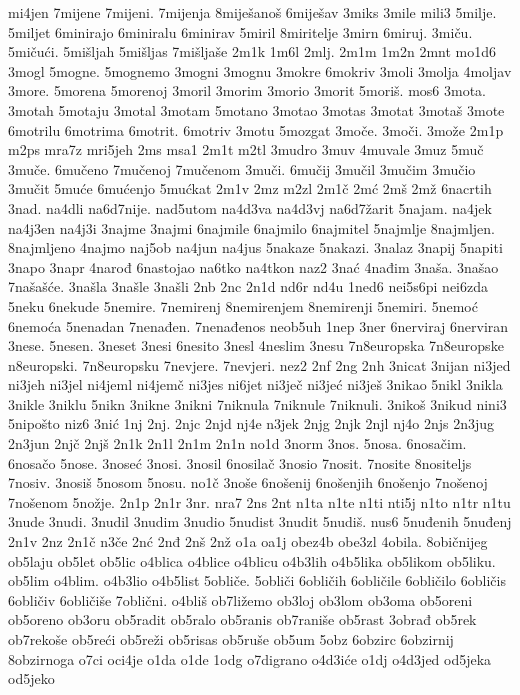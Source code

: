 {mi4jen
7mijene
7mijeni.
7mijenja
8miješanoš
6miješav
3miks
3mile
mili3
5milje.
5miljet
6minirajo
6miniralu
6minirav
5miril
8miritelje
3mirn
6miruj.
3miču.
5mičući.
5mišljah
5mišljas
7mišljaše
2m1k
1m6l
2mlj.
2m1m
1m2n
2mnt
mo1d6
3mogl
5mogne.
5mognemo
3mogni
3mognu
3mokre
6mokriv
3moli
3molja
4moljav
3more.
5morena
5morenoj
3moril
3morim
3morio
3morit
5moriš.
mos6
3mota.
3motah
5motaju
3motal
3motam
5motano
3motao
3motas
3motat
3motaš
3mote
6motrilu
6motrima
6motrit.
6motriv
3motu
5mozgat
3moče.
3moči.
3može
2m1p
m2ps
mra7z
mri5jeh
2ms
msa1
2m1t
m2tl
3mudro
3muv
4muvale
3muz
5muč
3muče.
6mučeno
7mučenoj
7mučenom
3muči.
6mučij
3mučil
3mučim
3mučio
3mučit
5muće
6mućenjo
5mućkat
2m1v
2mz
m2zl
2m1č
2mć
2mš
2mž
6nacrtih
3nad.
na4dli
na6d7nije.
nad5utom
na4d3va
na4d3vj
na6d7žarit
5najam.
na4jek
na4j3en
na4j3i
3najme
3najmi
6najmile
6najmilo
6najmitel
5najmlje
8najmljen.
8najmljeno
4najmo
naj5ob
na4jun
na4jus
5nakaze
5nakazi.
3nalaz
3napij
5napiti
3napo
3napr
4narođ
6nastojao
na6tko
na4tkon
naz2
3nać
4nađim
3naša.
3našao
7našašće.
3našla
3našle
3našli
2nb
2nc
2n1d
nd6r
nd4u
1ned6
nei5s6pi
nei6zda
5neku
6nekude
5nemire.
7nemirenj
8nemirenjem
8nemirenji
5nemiri.
5nemoć
6nemoća
5nenadan
7nenađen.
7nenađenos
neob5uh
1nep
3ner
6nerviraj
6nerviran
3nese.
5nesen.
3neset
3nesi
6nesito
3nesl
4neslim
3nesu
7n8europska
7n8europske
n8europski.
7n8europsku
7nevjere.
7nevjeri.
nez2
2nf
2ng
2nh
3nicat
3nijan
ni3jed
ni3jeh
ni3jel
ni4jeml
ni4jemč
ni3jes
ni6jet
ni3ječ
ni3jeć
ni3ješ
3nikao
5nikl
3nikla
3nikle
3niklu
5nikn
3nikne
3nikni
7niknula
7niknule
7niknuli.
3nikoš
3nikud
nini3
5nipošto
niz6
3nić
1nj
2nj.
2njc
2njd
nj4e
n3jek
2njg
2njk
2njl
nj4o
2njs
2n3jug
2n3jun
2njč
2njš
2n1k
2n1l
2n1m
2n1n
no1d
3norm
3nos.
5nosa.
6nosačim.
6nosačo
5nose.
3noseć
3nosi.
3nosil
6nosilač
3nosio
7nosit.
7nosite
8nositeljs
7nosiv.
3nosiš
5nosom
5nosu.
no1č
3noše
6nošenij
6nošenjih
6nošenjo
7nošenoj
7nošenom
5nožje.
2n1p
2n1r
3nr.
nra7
2ns
2nt
n1ta
n1te
n1ti
nti5j
n1to
n1tr
n1tu
3nude
3nudi.
3nudil
3nudim
3nudio
5nudist
3nudit
5nudiš.
nus6
5nuđenih
5nuđenj
2n1v
2nz
2n1č
n3če
2nć
2nđ
2nš
2nž
o1a
oa1j
obez4b
obe3zl
4obila.
8običnijeg
ob5laju
ob5let
ob5lic
o4blica
o4blice
o4blicu
o4b3lih
o4b5lika
ob5likom
ob5liku.
ob5lim
o4blim.
o4b3lio
o4b5list
5obliče.
5obliči
6obličih
6obličile
6obličilo
6obličis
6obličiv
6obličiše
7oblični.
o4bliš
ob7ližemo
ob3loj
ob3lom
ob3oma
ob5oreni
ob5oreno
ob3oru
ob5radit
ob5ralo
ob5ranis
ob7raniše
ob5rast
3obrađ
ob5rek
ob7rekoše
ob5reći
ob5reži
ob5risas
ob5ruše
ob5um
5obz
6obzirc
6obzirnij
8obzirnoga
o7ci
oci4je
o1da
o1de
1odg
o7digrano
o4d3iće
o1dj
o4d3jed
od5jeka
od5jeko
}
